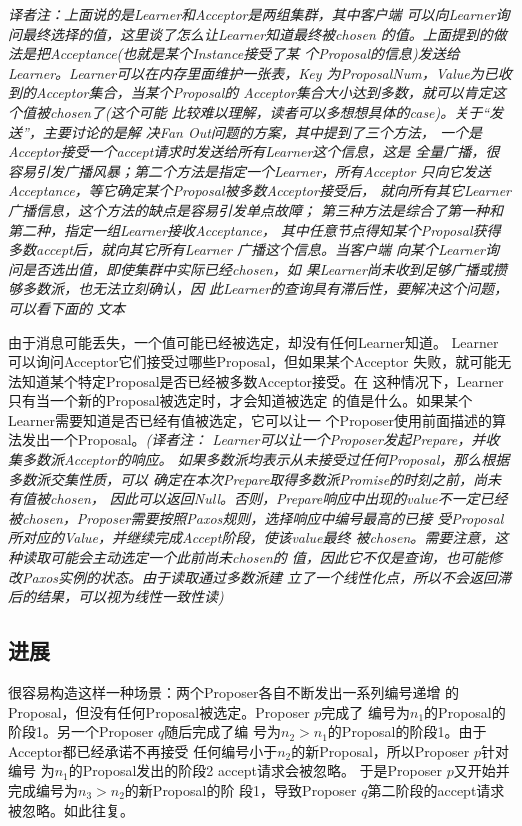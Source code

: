 \emph{译者注：上面说的是Learner和Acceptor是两组集群，其中客户端
可以向Learner询问最终选择的值，这里谈了怎么让Learner知道最终被chosen
的值。上面提到的做法是把Acceptance(也就是某个Instance接受了某
个Proposal的信息)发送给Learner。Learner可以在内存里面维护一张表，Key
为ProposalNum，Value为已收到的Acceptor集合，当某个Proposal的
Acceptor集合大小达到多数，就可以肯定这个值被chosen了(这个可能
比较难以理解，读者可以多想想具体的case)。关于“发送”，主要讨论的是解
决Fan Out问题的方案，其中提到了三个方法，
一个是Acceptor接受一个accept请求时发送给所有Learner这个信息，这是
全量广播，很容易引发广播风暴；第二个方法是指定一个Learner，所有Acceptor
只向它发送Acceptance，等它确定某个Proposal被多数Acceptor接受后，
就向所有其它Learner广播信息，这个方法的缺点是容易引发单点故障；
第三种方法是综合了第一种和第二种，指定一组Learner接收Acceptance，
其中任意节点得知某个Proposal获得多数accept后，就向其它所有Learner
广播这个信息。当客户端
向某个Learner询问是否选出值，即使集群中实际已经chosen，如
果Learner尚未收到足够广播或攒够多数派，也无法立刻确认，因
此Learner的查询具有滞后性，要解决这个问题，可以看下面的
文本}

由于消息可能丢失，一个值可能已经被选定，却没有任何Learner知道。
Learner可以询问Acceptor它们接受过哪些Proposal，但如果某个Acceptor
失败，就可能无法知道某个特定Proposal是否已经被多数Acceptor接受。在
这种情况下，Learner只有当一个新的Proposal被选定时，才会知道被选定
的值是什么。如果某个Learner需要知道是否已经有值被选定，它可以让一
个Proposer使用前面描述的算法发出一个Proposal。\emph{(译者注：
Learner可以让一个Proposer发起Prepare，并收集多数派Acceptor的响应。
如果多数派均表示从未接受过任何Proposal，那么根据多数派交集性质，可以
确定在本次Prepare取得多数派Promise的时刻之前，尚未有值被chosen，
因此可以返回Null。否则，Prepare响应中出现的value不一定已经
被chosen，Proposer需要按照Paxos规则，选择响应中编号最高的已接
受Proposal所对应的Value，并继续完成Accept阶段，使该value最终
被chosen。需要注意，这种读取可能会主动选定一个此前尚未chosen的
值，因此它不仅是查询，也可能修改Paxos实例的状态。由于读取通过多数派建
立了一个线性化点，所以不会返回滞后的结果，可以视为线性一致性读)}

\subsection{进展}
很容易构造这样一种场景：两个Proposer各自不断发出一系列编号递增
的Proposal，但没有任何Proposal被选定。Proposer \(p\)完成了
编号为\(n_1\)的Proposal的阶段1。另一个Proposer \(q\)随后完成了编
号为\(n_2>n_1\)的Proposal的阶段1。由于Acceptor都已经承诺不再接受
任何编号小于\(n_2\)的新Proposal，所以Proposer \(p\)针对编号
为\(n_1\)的Proposal发出的阶段2 accept请求会被忽略。
于是Proposer \(p\)又开始并完成编号为\(n_3>n_2\)的新Proposal的阶
段1，导致Proposer \(q\)第二阶段的accept请求被忽略。如此往复。

